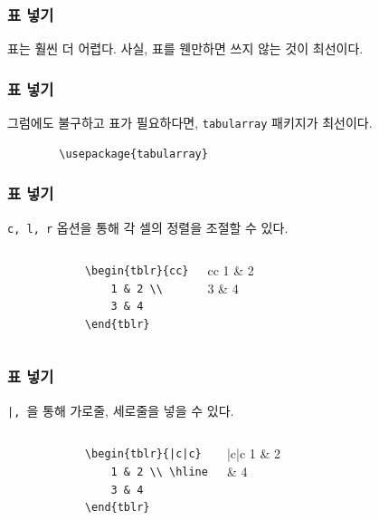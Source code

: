 \documentclass[aspectratio={169}]{beamer}
\begin{document}
\begin{frame}
    \frametitle{표 넣기}

    표는 훨씬 더 어렵다. 사실, 표를 웬만하면 쓰지 않는 것이 최선이다.

\end{frame}

\begin{frame}[fragile]
    \frametitle{표 넣기}

    그럼에도 불구하고 표가 필요하다면, \texttt{tabularray} 패키지가 최선이다.

    \begin{verbatim}
        \usepackage{tabularray}
    \end{verbatim}

\end{frame}

\begin{frame}[fragile]
    \frametitle{표 넣기}

    \texttt{c, l, r} 옵션을 통해 각 셀의 정렬을 조절할 수 있다.

    \begin{columns}[c]
        \begin{verbatim}
            \begin{tblr}{cc}
                1 & 2 \\
                3 & 4
            \end{tblr}
        \end{verbatim}

        \begin{tblr}{cc}
            1 & 2 \\
            3 & 4
        \end{tblr}
    \end{columns}

\end{frame}

\begin{frame}[fragile]
    \frametitle{표 넣기}

    \texttt{|, \hline}을 통해 가로줄, 세로줄을 넣을 수 있다.

    \begin{columns}[c]
        \begin{verbatim}
            \begin{tblr}{|c|c}
                1 & 2 \\ \hline
                3 & 4
            \end{tblr}
        \end{verbatim}

        \begin{tblr}{|c|c}
            1 & 2 \\  & 4
        \end{tblr}
    \end{columns}

\end{frame}
\end{document}
